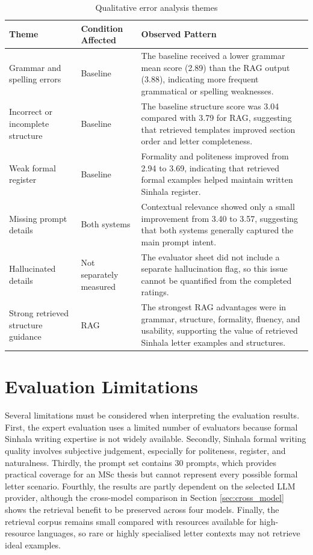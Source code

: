 \documentclass[12pt]{uomthesis}
\begin{document}
\begin{table}[!htbp]
\centering
\small
\begin{tabularx}{\linewidth}{@{}p{3.5cm}p{3cm}X@{}}
\toprule
\textbf{Theme} & \textbf{Condition Affected} & \textbf{Observed Pattern} \\
\midrule
Grammar and spelling errors & Baseline & The baseline received a lower grammar mean score (2.89) than the RAG output (3.88), indicating more frequent grammatical or spelling weaknesses. \\
Incorrect or incomplete structure & Baseline & The baseline structure score was 3.04 compared with 3.79 for RAG, suggesting that retrieved templates improved section order and letter completeness. \\
Weak formal register & Baseline & Formality and politeness improved from 2.94 to 3.69, indicating that retrieved formal examples helped maintain written Sinhala register. \\
Missing prompt details & Both systems & Contextual relevance showed only a small improvement from 3.40 to 3.57, suggesting that both systems generally captured the main prompt intent. \\
Hallucinated details & Not separately measured & The evaluator sheet did not include a separate hallucination flag, so this issue cannot be quantified from the completed ratings. \\
Strong retrieved structure guidance & RAG & The strongest RAG advantages were in grammar, structure, formality, fluency, and usability, supporting the value of retrieved Sinhala letter examples and structures. \\
\bottomrule
\end{tabularx}
\caption{Qualitative error analysis themes}
\label{tab:qualitative_error_analysis}
\end{table}

\section{Evaluation Limitations}

Several limitations must be considered when interpreting the evaluation results. First, the expert evaluation uses a limited number of evaluators because formal Sinhala writing expertise is not widely available. Secondly, Sinhala formal writing quality involves subjective judgement, especially for politeness, register, and naturalness. Thirdly, the prompt set contains 30 prompts, which provides practical coverage for an MSc thesis but cannot represent every possible formal letter scenario. Fourthly, the results are partly dependent on the selected LLM provider, although the cross-model comparison in Section \ref{sec:cross_model} shows the retrieval benefit to be preserved across four models. Finally, the retrieval corpus remains small compared with resources available for high-resource languages, so rare or highly specialised letter contexts may not retrieve ideal examples.
\end{document}
